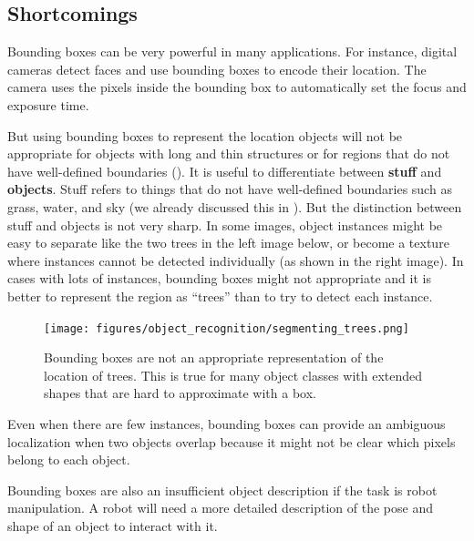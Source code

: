 
		

\subsection{Shortcomings}

Bounding boxes can be very powerful in many applications. For instance, digital cameras detect faces and use bounding boxes to encode their location. The camera uses the pixels inside the bounding box to automatically set the focus and exposure time.

But using bounding boxes to represent the location objects will not be appropriate for objects with long and thin structures or for regions that do not have well-defined boundaries (\fig{\ref{fig:segmenting_trees}}). It is useful to differentiate between {\bf stuff} and {\bf objects}. Stuff refers to things that do not have well-defined boundaries such as grass, water, and sky (we already discussed this in \chap{\ref{chap:textures}}). But the distinction between stuff and objects is not very sharp. In some images, object instances might be easy to separate like the two trees in the left image below, or become a texture where instances cannot be detected individually (as shown in the right image). In cases with lots of instances, bounding boxes might not appropriate and it is better to represent the region as ``trees'' than to try to detect each instance.  

\begin{figure}
\centerline{
\texttt{[image: figures/object\_recognition/segmenting\_trees.png]}
}
\caption{Bounding boxes are not an appropriate representation of the location of trees. This is true for many object classes with extended shapes that are hard to approximate with a box.}
\label{fig:segmenting_trees}
\end{figure}

Even when there are few instances, bounding boxes can provide an ambiguous localization when two objects overlap because it might not be clear which pixels belong to each object. 

Bounding boxes are also an insufficient object description if the task is robot manipulation. A robot will need a more detailed description of the pose and shape of an object to interact with it. 

